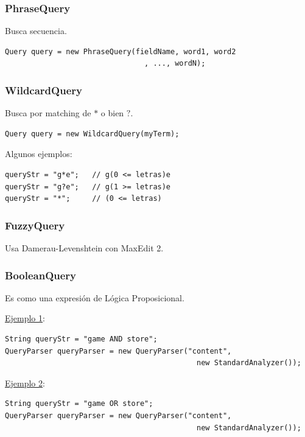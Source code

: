 \documentclass{article}
\begin{document}
\subsubsection{PhraseQuery}
Busca secuencia.
\begin{ejemplo}
\begin{lstlisting}
Query query = new PhraseQuery(fieldName, word1, word2
                                , ..., wordN);
\end{lstlisting}
\end{ejemplo}

\subsubsection{WildcardQuery}
Busca por matching de $*$ o bien $?$.
\begin{ejemplo}
\begin{lstlisting}
Query query = new WildcardQuery(myTerm);
\end{lstlisting}
Algunos ejemplos:
\begin{lstlisting}
queryStr = "g*e";   // g(0 <= letras)e
queryStr = "g?e";   // g(1 >= letras)e
queryStr = "*";     // (0 <= letras)
\end{lstlisting}
\end{ejemplo}

\subsubsection{FuzzyQuery}
Usa Damerau-Levenshtein con MaxEdit 2.

\subsubsection{BooleanQuery}
Es como una expresión de Lógica Proposicional.
\begin{ejemplo}
\underline{Ejemplo 1}:
\begin{lstlisting}
String queryStr = "game AND store";
QueryParser queryParser = new QueryParser("content", 
                                            new StandardAnalyzer());
\end{lstlisting}

\underline{Ejemplo 2}:
\begin{lstlisting}
String queryStr = "game OR store";
QueryParser queryParser = new QueryParser("content", 
                                            new StandardAnalyzer());
\end{lstlisting}
\end{ejemplo}
\end{document}
